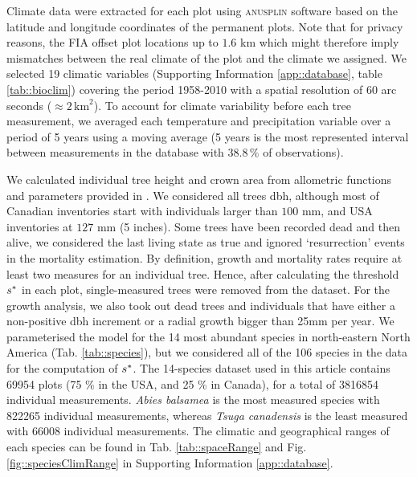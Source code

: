 Climate data were extracted for each plot using \textsc{anusplin} software \citep{McKenney2011} based on the latitude and longitude coordinates of the permanent plots. Note that for privacy reasons, the FIA offset plot locations up to $ 1.6 $ km \citep{Gray2012} which might therefore imply mismatches between the real climate of the plot and the climate we assigned. We selected 19 climatic variables (Supporting Information \ref{app::database}, table \ref{tab::bioclim}) covering the period 1958-2010 with a spatial resolution of 60 arc seconds ($ \approx 2 \, \text{km}^2 $). To account for climate variability before each tree measurement, we averaged each temperature and precipitation variable over a period of 5 years using a moving average (5 years is the most represented interval between measurements in the database with $ 38.8 \, \% $ of observations).

We calculated individual tree height and crown area from allometric functions and parameters provided in \citet{Purves2007}. We considered all trees dbh, although most of Canadian inventories start with individuals larger than $ 100 $ mm, and USA inventories at $ 127 $ mm (5 inches). Some trees have been recorded dead and then alive, we considered the last living state as true and ignored `resurrection' events in the mortality estimation. By definition, growth and mortality rates require at least two measures for an individual tree. Hence, after calculating the threshold $ {s}^{*} $ in each plot, single-measured trees were removed from the dataset. For the growth analysis, we also took out dead trees and individuals that have either a non-positive dbh increment or a radial growth bigger than 25mm per year. We parameterised the model for the 14 most abundant species in north-eastern North America (Tab. \ref{tab::species}), but we considered all of the 106 species in the data for the computation of $ {s}^{*} $. The 14-species dataset used in this article contains \num{69954} plots (75 \% in the USA, and 25 \% in Canada), for a total of \num{3816854} individual measurements. \textit{Abies balsamea} is the most measured species with \num{822265} individual measurements, whereas \textit{Tsuga canadensis} is the least measured with \num{66008} individual measurements. The climatic and geographical ranges of each species can be found in Tab. \ref{tab::spaceRange} and Fig. \ref{fig::speciesClimRange} in Supporting Information \ref{app::database}.

